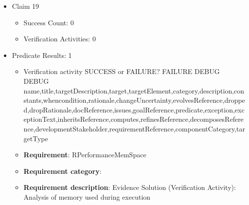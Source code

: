 \documentclass{article}
\begin{document}
\begin{itemize}
  				  \item Claim 19
				\begin{itemize}
			    	\item Success Count: 0 
			    	\item Verification Activities: 0
				\end{itemize}
				
									    
				\item Predicate Results: 1
					\begin{itemize}				
					\item Verification activity SUCCESS or FAILURE? FAILURE
					DEBUG DEBUG name,title,targetDescription,target,targetElement,category,description,constants,whencondition,rationale,changeUncertainty,evolvesReference,dropped,dropRationale,docReference,issues,goalReference,predicate,exception,exceptionText,inheritsReference,computes,refinesReference,decomposesReference,developmentStakeholder,requirementReference,componentCategory,targetType
					\item \textbf{Requirement}: RPerformanceMemSpace 
					\item \textbf{Requirement category}: 
					\item \textbf{Requirement description}: Evidence Solution (Verification Activity): Analysis of memory used during execution
					\end{itemize}

			\end{itemize}

		
\end{document}
